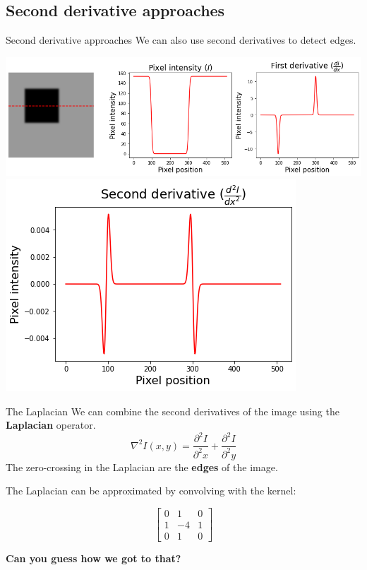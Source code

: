 \documentclass[9pt, aspectratio=169]{beamer}
\begin{document}


\subsection{Second derivative approaches}

\begin{frame}
    {Second derivative approaches}
    We can also use second derivatives to detect edges.

    \centering
    \includegraphics[width=.7\textwidth]{intensity_derivative.png}
    \pause
    \centering
    \includegraphics[width=.3\textwidth]{intensity_second_derivative.png}
\end{frame}

\begin{frame}
    {The Laplacian}
    We can combine the second derivatives of the image using the \textbf{Laplacian} operator.
    \Large{
    $$\nabla^2 I(x,y) = \frac{\partial^2{I}}{\partial^2{x}}+ \frac{\partial^2{I}}{\partial^2{y}}$$
    }
    \normalsize
    The zero-crossing in the Laplacian are the \textbf{edges} of the image.

    The Laplacian can be approximated by convolving with the kernel:

    $$\begin{bmatrix}
            0 & 1  & 0 \\
            1 & -4 & 1 \\
            0 & 1  & 0
        \end{bmatrix}$$

    \textbf{Can you guess how we got to that?}
\end{frame}
\end{document}
